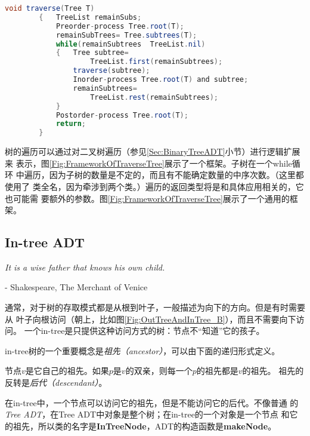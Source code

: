 \begin{figure*}[!t]
    \centering
    \begin{lstlisting}[language={Java}, keywordstyle=\color{blue!70}, commentstyle=\color{red!50!green!50!blue!50}]
        void traverse(Tree T)
        {   TreeList remainSubs;
            Preorder-process Tree.root(T);
            remainSubTrees= Tree.subtrees(T);
            while(remainSubtrees  TreeList.nil)
            {   Tree subtree=
                    TreeList.first(remainSubtrees);
                traverse(subtree);
                Inorder-process Tree.root(T) and subtree;
                remainSubtrees=
                    TreeList.rest(remainSubtrees);
            }
            Postorder-process Tree.root(T);
            return;
        }
    \end{lstlisting}
    \caption{树的遍历框架}
    \label{Fig:FrameworkOfTraverseTree}
\end{figure*}

树的遍历可以通过对二叉树遍历（参见\ref{Sec:BinaryTreeADT}小节）进行逻辑扩展来
表示，图\ref{Fig:FrameworkOfTraverseTree}展示了一个框架。子树在一个while循环
中遍历，因为子树的数量是不定的，而且有不能确定数量的中序次数。（这里都使用了
类全名，因为牵涉到两个类。）遍历的返回类型将是和具体应用相关的，它也可能需
要额外的参数。图\ref{Fig:FrameworkOfTraverseTree}展示了一个通用的框架。


\subsection{In-tree ADT}\label{Sec:In-treeADT}
\emph{It is a wise father that knows his own child.}

\indent\indent\indent    - Shakespeare, The Merchant of Venice

通常，对于树的存取模式都是从根到叶子，一般描述为向下的方向。但是有时需要从
叶子向根访问（朝上，比如图\ref{Fig:OutTreeAndInTree_B}），而且不需要向下访问。
一个in-tree是只提供这种访问方式的树：节点不“知道”它的孩子。

in-tree树的一个重要概念是\emph{祖先（ancestor）}，可以由下面的递归形式定义。

\begin{definition}


节点$v$是它自己的祖先。如果$p$是$v$的双亲，则每一个$p$的祖先都是$v$的祖先。
祖先的反转是\emph{后代（descendant）}。
\end{definition}

在in-tree中，一个节点可以访问它的祖先，但是不能访问它的后代。不像普通
的\emph{Tree ADT}，在Tree ADT中对象是整个树；在in-tree的一个对象是一个节点
和它的祖先，所以类的名字是\textbf{InTreeNode}，ADT的构造函数是\textbf{makeNode}。

